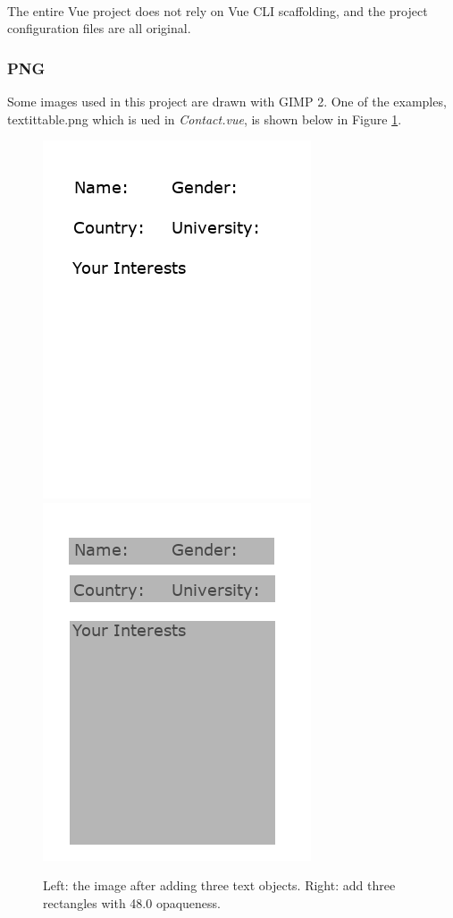 \documentclass{article}
\begin{document}
~\\
\noindent
The entire Vue project does not rely on Vue CLI scaffolding, 
and the project configuration files are all original.

\subsubsection{PNG}
Some images used in this project are drawn with GIMP 2. One of the examples,
textit{table.png} which is ued in \textit{Contact.vue}, is shown below in 
Figure \ref{fig: figure2}.

\begin{figure}[h]
    \centering
    \includegraphics{img/sectionPNG/table2.png}
    \includegraphics{img/sectionPNG/table1.png}
    \caption{Left: the image after adding three text objects. 
    Right: add three rectangles with 48.0 opaqueness.}
    \label{fig: figure2}
\end{figure}
\end{document}
